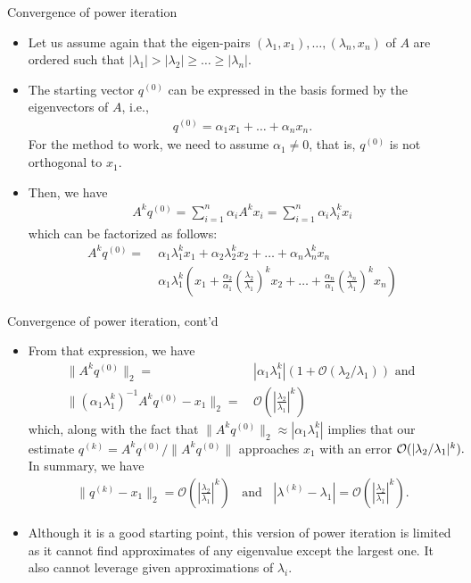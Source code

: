 \documentclass[t,usepdftitle=false]{beamer}
\begin{document}
\begin{frame}{Convergence of power iteration}
\begin{itemize}
\item Let us assume again that the eigen-pairs $(\lambda_1,x_1),\dots,(\lambda_n,x_n)$ of $A$ are ordered such that $|\lambda_1|>|\lambda_2|\geq\dots\geq|\lambda_n|$.
\item The starting vector $q^{(0)}$ can be expressed in the basis formed by the eigenvectors of $A$, i.e.,
\begin{align*}
q^{(0)}=\alpha_1x_1+\dots+\alpha_nx_n.
\end{align*}
For the method to work, we need to assume $\alpha_1\neq 0$, that is, $q^{(0)}$ is not orthogonal to $x_1$.
\item Then, we have
\begin{align*}
A^kq^{(0)}=\sum_{i=1}^n\alpha_iA^kx_i=\sum_{i=1}^n\alpha_i\lambda_i^kx_i
\end{align*}
which can be factorized as follows:
\begin{align*}
A^kq^{(0)}=
&\;\alpha_1\lambda_1^kx_1+\alpha_2\lambda_2^kx_2+\dots+\alpha_n\lambda_n^kx_n\\
&\;\alpha_1\lambda_1^k\left(x_1+\frac{\alpha_2}{\alpha_1}\left(\frac{\lambda_2}{\lambda_1}\right)^kx_2+\dots+\frac{\alpha_n}{\alpha_1}\left(\frac{\lambda_n}{\lambda_1}\right)^kx_n\right)
\end{align*}
\end{itemize}
\end{frame}

\begin{frame}{Convergence of power iteration, cont'd}
\begin{itemize}
\item[] From that expression, we have
\begin{align*}
\|A^kq^{(0)}\|_2=&\,|\alpha_1\lambda_1^k|(1+\mathcal{O}(\lambda_2/\lambda_1))
\text{  and  }\\
\|(\alpha_1\lambda_1^k)^{-1}A^kq^{(0)}-x_1\|_2=&\,\mathcal{O}\left(\left|\frac{\lambda_2}{\lambda_1}\right|^k\right)
\end{align*}
which, along with the fact that $\|A^kq^{(0)}\|_2\approx|\alpha_1\lambda_1^k|$ implies that our estimate $q^{(k)}=A^kq^{(0)}/\|A^kq^{(0)}\|$ approaches $x_1$ with an error $\mathcal{O}(|\lambda_2/\lambda_1|^k).\hspace{-1cm}$\vspace{.1cm}\\
In summary, we have
\begin{align*}
\|q^{(k)}-x_1\|_2=\mathcal{O}\left(\left|\frac{\lambda_2}{\lambda_1}\right|^k\right)
\;\;\text{ and }\;\;   
|\lambda^{(k)}-\lambda_1|=\mathcal{O}\left(\left|\frac{\lambda_2}{\lambda_1}\right|^k\right).
\end{align*}
\item Although it is a good starting point, this version of power iteration is limited as it cannot find approximates of any eigenvalue except the largest one.
It also cannot leverage given approximations of $\lambda_i$.
\end{itemize}
\end{frame}
\end{document}
